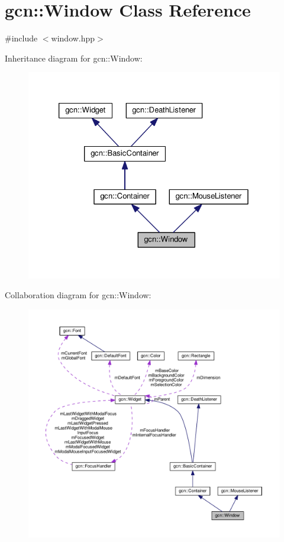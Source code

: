 \hypertarget{classgcn_1_1Window}{}\section{gcn\+:\+:Window Class Reference}
\label{classgcn_1_1Window}


{\ttfamily \#include $<$window.\+hpp$>$}



Inheritance diagram for gcn\+:\+:Window\+:\nopagebreak
\begin{figure}[H]
\begin{center}
\leavevmode
\includegraphics[width=326pt]{classgcn_1_1Window__inherit__graph}
\end{center}
\end{figure}


Collaboration diagram for gcn\+:\+:Window\+:\nopagebreak
\begin{figure}[H]
\begin{center}
\leavevmode
\includegraphics[width=350pt]{classgcn_1_1Window__coll__graph}
\end{center}
\end{figure}
